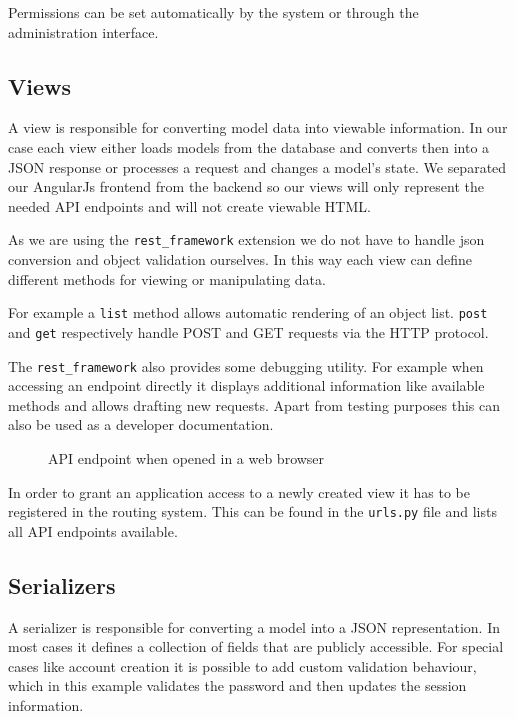 Permissions can be set automatically by the system or through the
administration interface.

\subsection{Views}\label{views-1}

A view is responsible for converting model data into viewable
information. In our case each view either loads models from the database
and converts then into a JSON response or processes a request and
changes a model's state. We separated our AngularJs frontend from the
backend so our views will only represent the needed API endpoints and
will not create viewable HTML.

As we are using the \texttt{rest\_framework} extension we do not have to
handle json conversion and object validation ourselves. In this way each
view can define different methods for viewing or manipulating data.

For example a \texttt{list} method allows automatic rendering of an
object list. \texttt{post} and \texttt{get} respectively handle POST and
GET requests via the HTTP protocol.

The \texttt{rest\_framework} also provides some debugging utility. For
example when accessing an endpoint directly it displays additional
information like available methods and allows drafting new requests.
Apart from testing purposes this can also be used as a developer
documentation.

\begin{figure}[htbp]
\centering
{}
\caption{API endpoint when opened in a web browser}
\end{figure}

In order to grant an application access to a newly created view it has
to be registered in the routing system. This can be found in the
\texttt{urls.py} file and lists all
API endpoints available.

\subsection{Serializers}\label{serializers}

A serializer is responsible for converting a model into a JSON
representation. In most cases it defines a collection of fields that are
publicly accessible. For special cases like account creation it is
possible to add custom validation behaviour, which in this example
validates the password and then updates the session information.

